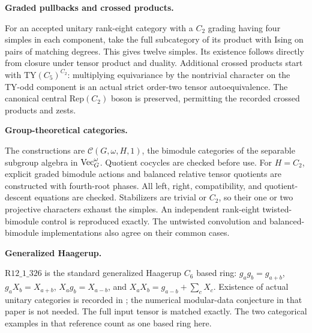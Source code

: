 \documentclass[11pt]{article}
\begin{document}
\textbf{Graded pullbacks and crossed products.}\par
For an accepted unitary rank-eight category with a $C_2$ grading having four simples
in each component, take the full subcategory of its product with Ising on pairs
of matching degrees. This gives twelve simples. Its existence follows directly from
closure under tensor product and duality. Additional crossed products start with
$\mathrm{TY}(C_5)^{C_2}$: multiplying equivariance by the nontrivial character on
the TY-odd component is an actual strict order-two tensor autoequivalence. The
canonical central $\mathrm{Rep}(C_2)$ boson is preserved, permitting the recorded
crossed products and zests.

\textbf{Group-theoretical categories.}\par
The constructions are $\mathcal C(G,\omega,H,1)$, the bimodule categories of the
separable subgroup algebra in $\operatorname{Vec}_G^\omega$. Quotient cocycles are checked before
use. For $H=C_2$, explicit graded bimodule actions and balanced relative tensor
quotients are constructed with fourth-root phases. All left, right, compatibility,
and quotient-descent equations are checked. Stabilizers are trivial or $C_2$, so
their one or two projective characters exhaust the simples. An independent
rank-eight twisted-bimodule control is reproduced exactly. The untwisted convolution
and balanced-bimodule implementations also agree on their common cases.

\textbf{Generalized Haagerup.}\par
$\mathrm{R12\_1\_326}$ is the standard generalized Haagerup $C_6$ based ring:
$g_ag_b=g_{a+b}$, $g_aX_b=X_{a+b}$, $X_ag_b=X_{a-b}$, and
$X_aX_b=g_{a-b}+\sum_cX_c$. Existence of actual unitary categories is recorded in
\cite[Example 4.5]{GI}; the numerical modular-data conjecture in that paper is
not needed. The full input tensor is matched exactly. The two categorical examples
in that reference count as one based ring here.
\end{document}

